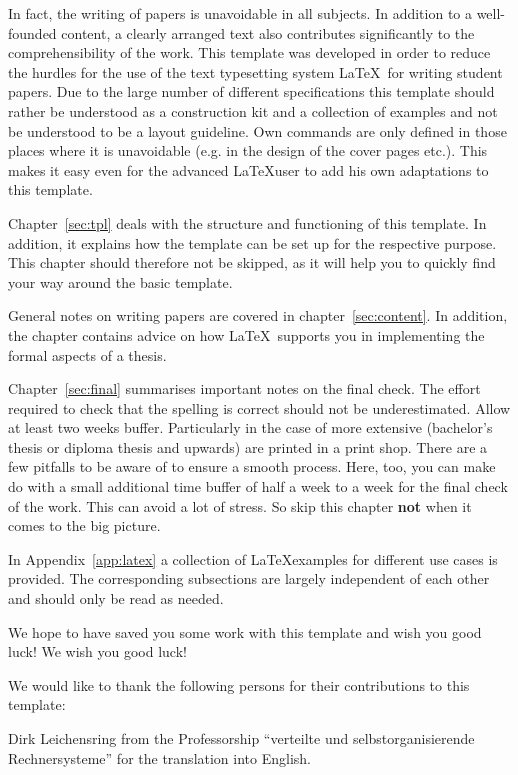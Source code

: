 In fact, the writing of papers is unavoidable in all subjects. In addition to a
well-founded content, a clearly arranged text also contributes significantly to
the comprehensibility of the work. This template was developed in order to
reduce the hurdles for the use of the text typesetting system \LaTeX\ for
writing student papers. Due to the large number of different specifications
this template should rather be understood as a construction kit and a
collection of examples and not be understood to be a layout guideline. Own
commands are only defined in those places where it is unavoidable (e.g. in the
design of the cover pages etc.). This makes it easy even for the advanced
\LaTeX user to add his own adaptations to this template.

Chapter~\ref{sec:tpl} deals with the structure and functioning of this template.
In addition, it explains how the template can be set up for the respective
purpose. This chapter should therefore not be skipped, as it will help you to
quickly find your way around the basic template.

General notes on writing papers are covered in chapter~\ref{sec:content}. In
addition, the chapter contains advice on how \LaTeX\ supports you in
implementing the formal aspects of a thesis.

Chapter~\ref{sec:final} summarises important notes on the final check. The
effort required to check that the spelling is correct should not be
underestimated. Allow at least two weeks buffer. Particularly in the case of
more extensive (bachelor's thesis or diploma thesis and upwards) are printed in
a print shop. There are a few pitfalls to be aware of to ensure a smooth
process. Here, too, you can make do with a small additional time buffer of half
a week to a week for the final check of the work. This can avoid a lot of
stress. So skip this chapter \textbf{not} when it comes to the big picture.

In Appendix~\ref{app:latex} a collection of \LaTeX examples for different use
cases is provided. The corresponding subsections are largely independent of
each other and should only be read as needed.

We hope to have saved you some work with this template and wish you good luck!
We wish you good luck!

\newpage

We would like to thank the following persons for their contributions to this
template:

\begin{compactitem}
\item Dirk Leichensring from the Professorship ``verteilte und
      selbstorganisierende Rechnersysteme'' for the translation into English.
\end{compactitem}
